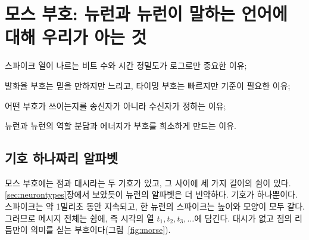 \chapter{모스 부호:  뉴런과  뉴런이 말하는 언어에 대해 우리가 아는 것}
\label{sec:code}
\begin{chaptergoals}
\item 스파이크 열이 나르는 비트 수와 시간 정밀도가 로그로만 중요한 이유;
\item 발화율 부호는 믿을 만하지만 느리고, 타이밍 부호는 빠르지만 기준이 필요한 이유;
\item 어떤 부호가 쓰이는지를 송신자가 아니라 수신자가 정하는 이유;
\item {} 뉴런과  뉴런의 역할 분담과 에너지가 부호를 희소하게 만드는 이유.
\end{chaptergoals}

\section{기호 하나짜리 알파벳}

모스 부호에는 점과 대시라는 두 기호가 있고, 그 사이에 세 가지 길이의 쉼이 있다. \ref{sec:neurontypes}장에서 보았듯이 뉴런의 알파벳은 더 빈약하다. 기호가 하나뿐이다. 스파이크는 약 1밀리초 동안 지속되고, 한 뉴런의 스파이크는 높이와 모양이 모두 같다. 그러므로 메시지 전체는 쉼에, 즉 시각의 열 $t_1,t_2,t_3,\dots$에 담긴다. 대시가 없고 점의 리듬만이 의미를 싣는 부호이다(그림~\ref{fig:morse}).

